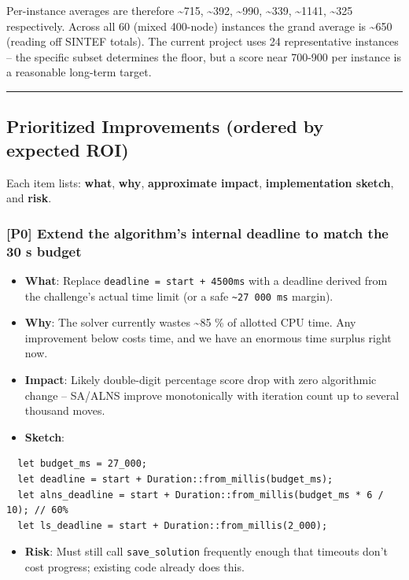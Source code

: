 \documentclass[twocolumn,10pt,letterpaper]{article}
\begin{document}
Per-instance averages are therefore \textasciitilde{}715, \textasciitilde{}392, \textasciitilde{}990, \textasciitilde{}339, \textasciitilde{}1141, \textasciitilde{}325 respectively. Across all 60 (mixed 400-node) instances the grand average is \textasciitilde{}650 (reading off SINTEF totals). The current project uses 24 representative instances -- the specific subset determines the floor, but a score near 700-900 per instance is a reasonable long-term target.


\vspace{0.5em}
\noindent\rule{\columnwidth}{0.4pt}
\vspace{0.5em}

\subsection{Prioritized Improvements (ordered by expected ROI)}

Each item lists: \textbf{what}, \textbf{why}, \textbf{approximate impact}, \textbf{implementation sketch}, and \textbf{risk}.


\subsubsection{[P0] Extend the algorithm's internal deadline to match the 30 s budget}
\begin{itemize}
\setlength{\itemsep}{0pt}
\setlength{\parskip}{0pt}
  \item \textbf{What}: Replace \texttt{deadline = start + 4500ms} with a deadline derived from the challenge's actual time limit (or a safe \texttt{\textasciitilde{}27 000 ms} margin).
  \item \textbf{Why}: The solver currently wastes \textasciitilde{}85 \% of allotted CPU time. Any improvement below costs time, and we have an enormous time surplus right now.
  \item \textbf{Impact}: Likely double-digit percentage score drop with zero algorithmic change -- SA/ALNS improve monotonically with iteration count up to several thousand moves.
  \item \textbf{Sketch}:
\end{itemize}
\begin{lstlisting}
  let budget_ms = 27_000;
  let deadline = start + Duration::from_millis(budget_ms);
  let alns_deadline = start + Duration::from_millis(budget_ms * 6 / 10); // 60%
  let ls_deadline = start + Duration::from_millis(2_000);
\end{lstlisting}
\begin{itemize}
\setlength{\itemsep}{0pt}
\setlength{\parskip}{0pt}
  \item \textbf{Risk}: Must still call \texttt{save\_solution} frequently enough that timeouts don't cost progress; existing code already does this.
\end{itemize}
\end{document}
